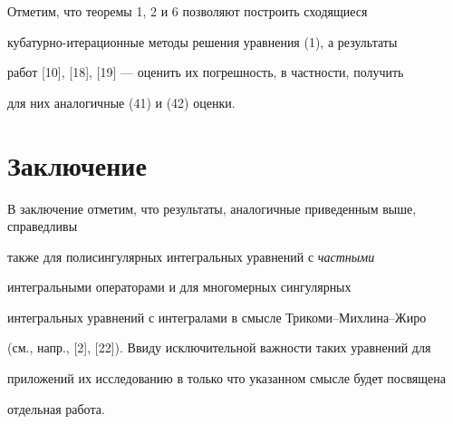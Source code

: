 Отметим, что теоремы 1, 2 и 6 позволяют построить сходящиеся


кубатурно-итерационные методы решения уравнения (1), а результаты 


работ [10], [18], [19] --- оценить их погрешность, в частности, получить 


для них аналогичные (41) и (42) оценки.








\section{Заключение}





В заключение отметим, что результаты, аналогичные приведенным выше, справедливы 


также для полисингулярных интегральных уравнений с {\it частными} 


интегральными операторами и для многомерных сингулярных 


интегральных уравнений с интегралами в смысле Трикоми--Михлина--Жиро 


(см., напр., [2], [22]). Ввиду исключительной важности таких уравнений для 


приложений их исследованию в только что указанном смысле будет посвящена 


отдельная работа.








